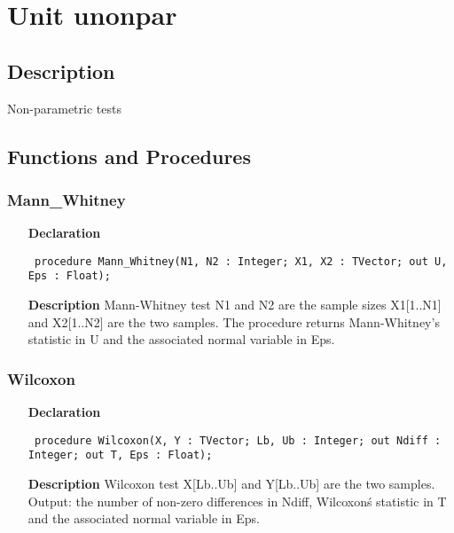 \documentclass[12pt,a4paper,oneside]{report}
\newcommand{\declarationitem}[1]{\textbf{#1}}
\newcommand{\descriptiontitle}[1]{\textbf{#1}}
\newcommand{\code}[1]{\texttt{#1}}
\begin{document}
\section{Unit unonpar}
\label{unonpar}
\subsection{Description}
Non{-}parametric tests
\subsection{Functions and Procedures}
\subsubsection{Mann{\_}Whitney}
\label{unonpar-Mann_Whitney}
\begin{itemize}\item[\declarationitem{Declaration}\hfill]
	\begin{flushleft}
		\code{
			procedure Mann{\_}Whitney(N1, N2 : Integer; X1, X2 : TVector; out U, Eps : Float);}
	\end{flushleft}
	\item[\descriptiontitle{Description}]
	Mann{-}Whitney test N1 and N2 are the sample sizes X1[1..N1] and X2[1..N2] are the two samples. The procedure returns Mann{-}Whitney's statistic in U and the associated normal variable in Eps.
\end{itemize}
\subsubsection{Wilcoxon}
\label{unonpar-Wilcoxon}
\begin{itemize}\item[\declarationitem{Declaration}\hfill]
	\begin{flushleft}
		\code{
			procedure Wilcoxon(X, Y : TVector; Lb, Ub : Integer; out Ndiff : Integer; out T, Eps : Float);}
	\end{flushleft}
	\item[\descriptiontitle{Description}]
	Wilcoxon test X[Lb..Ub] and Y[Lb..Ub] are the two samples. Output: the number of non{-}zero differences in Ndiff, Wilcoxon\'s statistic in T 
	and the associated normal variable in Eps.
\end{itemize}
\end{document}
